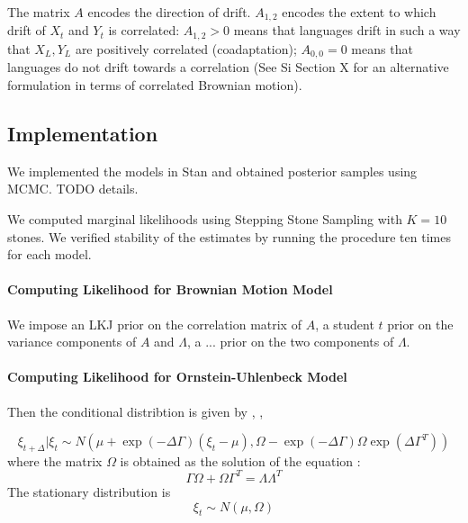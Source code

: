 \documentclass[11pt,a4paper]{article}
\begin{document}
The matrix $A$ encodes the direction of drift.
$A_{1,2}$ encodes the extent to which drift of $X_t$ and $Y_t$ is correlated:
$A_{1,2} > 0$ means that languages drift in such a way that $X_L, Y_L$ are positively correlated (coadaptation); $A_{0,0} = 0$ means that languages do not drift towards a correlation (See Si Section X for an alternative formulation in terms of correlated Brownian motion).

\subsection{Implementation}

We implemented the models in Stan and obtained posterior samples using MCMC. TODO details.

We computed marginal likelihoods using Stepping Stone Sampling with $K=10$ stones.
We verified stability of the estimates by running the procedure ten times for each model.

\paragraph{Computing Likelihood for Brownian Motion Model}

We impose an LKJ prior on the correlation matrix of $A$, a student $t$ prior on the variance components of $A$ and $\Lambda$, a ... prior on the two components of $\Lambda$.

\paragraph{Computing Likelihood for Ornstein-Uhlenbeck Model}

Then the conditional distribtion is given by \citep[Theorem 3.3]{schach1971weak}, \citep{gardiner1983handbook}, \citep[p. 156, eq. 6.124]{risken1989fokker}

\begin{equation}
\xi_{t+\Delta} | \xi_t \sim N\left(\mu + \exp(-\Delta \Gamma) (\xi_t-\mu), \Omega - \exp(-\Delta \Gamma) \Omega \exp(\Delta \Gamma^T) \right)
\end{equation}
where the matrix $\Omega$ is obtained as the solution of the equation \citep[p. 110, eq. 4.4.51]{gardiner1983handbook} \citep[p. 156, eq. 6.126]{risken1989fokker}:
\begin{equation}
    \Gamma\Omega+\Omega\Gamma^T = \Lambda \Lambda^T
\end{equation}
The stationary distribution is
\begin{equation}
\xi_{t} \sim N\left(\mu, \Omega \right)
\end{equation}
\end{document}
